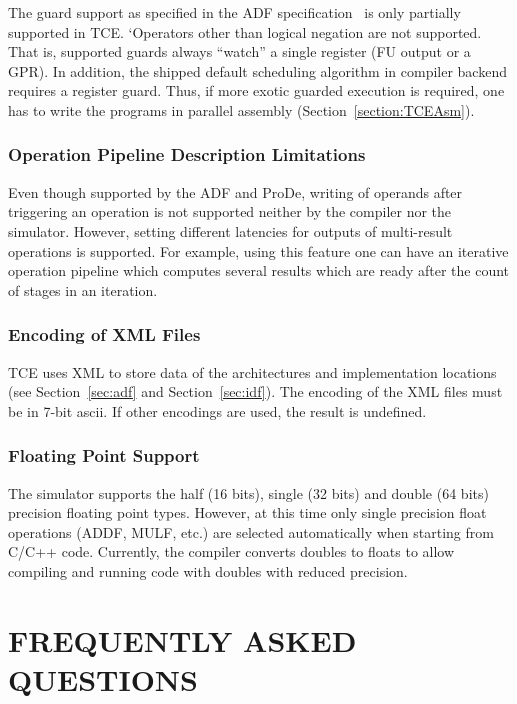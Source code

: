 \documentclass[a4paper,twoside]{tceusermanual}
\begin{document}
The guard support as specified in the ADF specification~\cite{ADF-specs} is
only partially supported in TCE. `Operators other than logical negation are
not supported. That is, supported guards always ``watch'' a single register
(FU output or a GPR). In addition, the shipped default scheduling algorithm
in compiler backend requires a register guard. Thus, if more exotic guarded
execution is required, one has to write the programs in parallel assembly
(Section~\ref{section:TCEAsm}).

\subsection{Operation Pipeline Description Limitations}

Even though supported by the ADF and ProDe, writing of operands after
triggering an operation is not supported neither by the compiler nor
the simulator. However, setting different latencies for outputs of 
multi-result operations is supported. For example, using this
feature one can have an iterative operation pipeline which computes 
several results which are ready after the count of stages in an iteration.

\subsection{Encoding of XML Files}

TCE uses XML to store data of the architectures and implementation 
locations (see Section~\ref{sec:adf} and Section~\ref{sec:idf}). The
encoding of the XML files must be in 7-bit ascii. If other encodings are
used, the result is undefined.

\subsection{Floating Point Support}

The simulator supports the half (16 bits), single (32 bits) and double
(64 bits) precision floating point types. However, at this time only
single precision float operations (ADDF, MULF, etc.) are selected 
automatically when starting from C/C++ code. Currently, the compiler 
converts doubles to floats to allow compiling and running code with 
doubles with reduced precision.

\appendix

\chapter{FREQUENTLY ASKED QUESTIONS}
\label{chapter:faq}
\end{document}

